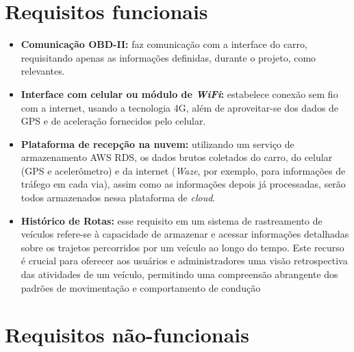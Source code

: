 \section{Requisitos funcionais}
\begin{itemize}
    \item \textbf{Comunicação OBD-II:} faz comunicação com a interface do carro, requisitando apenas as informações definidas, durante o projeto, como relevantes.
    
    \item \textbf{Interface com celular ou módulo de \textit{WiFi}:}  estabelece conexão sem fio com a internet, usando a tecnologia 4G, além de aproveitar-se dos dados de GPS e de aceleração fornecidos pelo celular.
    
    \item \textbf{Plataforma de recepção na nuvem:} utilizando um serviço de armazenamento AWS RDS, os dados brutos coletados do carro, do celular (GPS e acelerômetro) e da internet (\textit{Waze}, por exemplo, para informações de tráfego em cada via), assim como as informações depois já processadas, serão todos armazenados nessa plataforma de \textit{cloud}.
    
    \item \textbf{Histórico de Rotas:} esse requisito em um sistema de rastreamento de veículos refere-se à capacidade de armazenar e acessar informações detalhadas sobre os trajetos percorridos por um veículo ao longo do tempo. Este recurso é crucial para oferecer aos usuários e administradores uma visão retrospectiva das atividades de um veículo, permitindo uma compreensão abrangente dos padrões de movimentação e comportamento de condução
\end{itemize}

\section{Requisitos não-funcionais}

